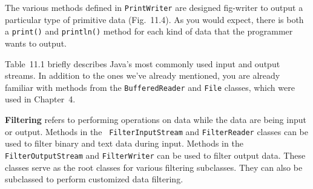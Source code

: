 
\pagebreak
The various methods defined in {\tt PrintWriter} are designed 
{fig-writer}
to output a particular type of primitive data (Fig.~11.4).
As you would expect, there is both a {\tt print()} and
{\tt println()} method for each kind of data that the programmer wants
to output.

Table~11.1 briefly describes Java's most commonly used input and
output streams.  In addition to the ones we've already mentioned, you
are already familiar with methods from the {\tt BufferedReader} and
{\tt File} classes, which were used in Chapter~4.

{\bf Filtering} refers to performing operations on
data while the data are being input or output.  Methods in the {\tt
FilterInputStream} and {\tt FilterReader} classes can be used to
filter binary and text data during input.  Methods in the {\tt
FilterOutputStream} and {\tt FilterWriter} can be used to filter
output data. These classes serve as the root classes for various
filtering subclasses.  They can also be subclassed to perform
customized data filtering.

